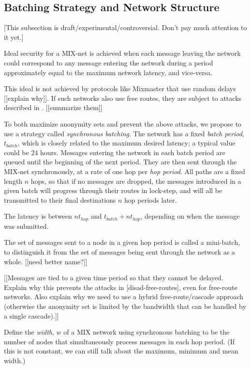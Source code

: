 \documentclass{llncs}
\begin{document}
\subsection{Batching Strategy and Network Structure}
\label{subsec:batching}

[This subsection is draft/experimental/controversial. Don't pay much
attention to it yet.]

Ideal security for a MIX-net is achieved when each message leaving the
network could correspond to any message entering the network during a
period approximately equal to the maximum network latency, and vice-versa.

This ideal is not achieved by protocols like Mixmaster that use random
delays [[explain why]].
If such networks also use free routes, they are subject to attacks
described in \cite{disad-free-routes}. [[summarize them]]

To both maximize anonymity sets and prevent the above attacks, we
propose to use a strategy called {\em synchronous batching}.
The network has a fixed {\em batch period}, $t_{batch}$, which is closely
related to the maximum desired latency; a typical value could be 24 hours.
Messages entering the network in each batch period are queued until
the beginning of the next period. They are then sent through the MIX-net
synchronously, at a rate of one hop per {\em hop period}. All paths are
a fixed length $n$ hops, so that if no messages are dropped, the messages
introduced in a given batch will progress through their routes in
lock-step, and will all be transmitted to their final destinations $n$
hop periods later.

The latency is between $nt_{hop}$ and $t_{batch} + nt_{hop}$, depending
on when the message was submitted.

The set of messages sent to a node in a given hop period is called a
mini-batch, to distinguish it from the set of messages being sent
through the network as a whole. [[need better name?]]

[[Messages are tied to a given time period so that they cannot be delayed.
Explain why this prevents the attacks in [disad-free-routes], even
for free-route networks. Also explain why we need to use a hybrid
free-route/cascade approach (otherwise the anonymity set is limited by
the bandwidth that can be handled by a single cascade).]]

Define the {\em width}, $w$ of a MIX network using synchronous batching to
be the number of nodes that simultaneously process messages in each
hop period. (If this is not constant, we can still talk about the
maximum, minimum and mean width.)
\end{document}
